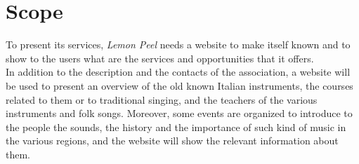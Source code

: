 \documentclass[../../DD.tex]{subfiles}
\begin{document}
\section{Scope}
	To present its services, \textit{Lemon Peel} needs a website to make itself known and to show to the users what are the services and opportunities that it offers. \\
	In addition to the description and the contacts of the association, a website will be used to present an overview of the old known Italian instruments, the courses related to them or to traditional singing, and the teachers of the various instruments and folk songs. Moreover, some events are organized to introduce to the people the sounds, the history and the importance of such kind of music in the various regions, and the website will show the relevant information about them.
\end{document}
